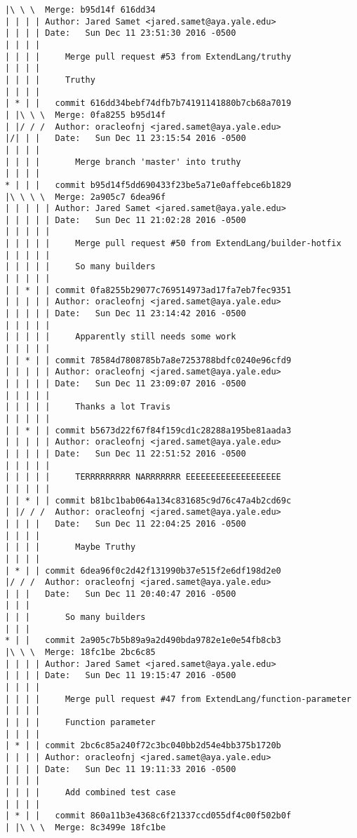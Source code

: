 \begin{lstlisting}
|\ \ \  Merge: b95d14f 616dd34
| | | | Author: Jared Samet <jared.samet@aya.yale.edu>
| | | | Date:   Sun Dec 11 23:51:30 2016 -0500
| | | | 
| | | |     Merge pull request #53 from ExtendLang/truthy
| | | |     
| | | |     Truthy
| | | |       
| * | |   commit 616dd34bebf74dfb7b74191141880b7cb68a7019
| |\ \ \  Merge: 0fa8255 b95d14f
| |/ / /  Author: oracleofnj <jared.samet@aya.yale.edu>
|/| | |   Date:   Sun Dec 11 23:15:54 2016 -0500
| | | |   
| | | |       Merge branch 'master' into truthy
| | | |       
* | | |   commit b95d14f5dd690433f23be5a71e0affebce6b1829
|\ \ \ \  Merge: 2a905c7 6dea96f
| | | | | Author: Jared Samet <jared.samet@aya.yale.edu>
| | | | | Date:   Sun Dec 11 21:02:28 2016 -0500
| | | | | 
| | | | |     Merge pull request #50 from ExtendLang/builder-hotfix
| | | | |     
| | | | |     So many builders
| | | | |      
| | * | | commit 0fa8255b29077c769514973ad17fa7eb7fec9351
| | | | | Author: oracleofnj <jared.samet@aya.yale.edu>
| | | | | Date:   Sun Dec 11 23:14:42 2016 -0500
| | | | | 
| | | | |     Apparently still needs some work
| | | | |      
| | * | | commit 78584d7808785b7a8e7253788bdfc0240e96cfd9
| | | | | Author: oracleofnj <jared.samet@aya.yale.edu>
| | | | | Date:   Sun Dec 11 23:09:07 2016 -0500
| | | | | 
| | | | |     Thanks a lot Travis
| | | | |      
| | * | | commit b5673d22f67f84f159cd1c28288a195be81aada3
| | | | | Author: oracleofnj <jared.samet@aya.yale.edu>
| | | | | Date:   Sun Dec 11 22:51:52 2016 -0500
| | | | | 
| | | | |     TERRRRRRRRR NARRRRRRR EEEEEEEEEEEEEEEEEEE
| | | | |      
| | * | | commit b81bc1bab064a134c831685c9d76c47a4b2cd69c
| |/ / /  Author: oracleofnj <jared.samet@aya.yale.edu>
| | | |   Date:   Sun Dec 11 22:04:25 2016 -0500
| | | |   
| | | |       Maybe Truthy
| | | |     
| * | | commit 6dea96f0c2d42f131990b37e515f2e6df198d2e0
|/ / /  Author: oracleofnj <jared.samet@aya.yale.edu>
| | |   Date:   Sun Dec 11 20:40:47 2016 -0500
| | |   
| | |       So many builders
| | |      
* | |   commit 2a905c7b5b89a9a2d490bda9782e1e0e54fb8cb3
|\ \ \  Merge: 18fc1be 2bc6c85
| | | | Author: Jared Samet <jared.samet@aya.yale.edu>
| | | | Date:   Sun Dec 11 19:15:47 2016 -0500
| | | | 
| | | |     Merge pull request #47 from ExtendLang/function-parameter
| | | |     
| | | |     Function parameter
| | | |     
| * | | commit 2bc6c85a240f72c3bc040bb2d54e4bb375b1720b
| | | | Author: oracleofnj <jared.samet@aya.yale.edu>
| | | | Date:   Sun Dec 11 19:11:33 2016 -0500
| | | | 
| | | |     Add combined test case
| | | |       
| * | |   commit 860a11b3e4368c6f21337ccd055df4c00f502b0f
| |\ \ \  Merge: 8c3499e 18fc1be

\end{lstlisting}
